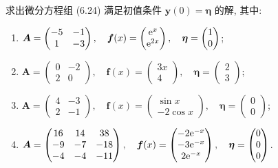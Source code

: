\begin{exercise}
  求出微分方程组 (6.24) 满足初值条件 $\bm{y}(0)=\bm{\eta}$ 的解, 其中:
  \begin{enumerate}[(1)]
  \item $\bm{A}=\begin{pmatrix}-5&-1\\1&-3\end{pmatrix},
    \quad\bm{f}(x)=\begin{pmatrix}\mathrm{e}^x\\\mathrm{e}^{2x}\end{pmatrix},
    \quad\bm{\eta}=\begin{pmatrix}1\\0\end{pmatrix}$;
  \item $\bm{A}=\begin{pmatrix}0&-2\\2&0\end{pmatrix},
    \quad\bm{f}(x)=\begin{pmatrix}3x\\4\end{pmatrix},
    \quad\bm{\eta}=\begin{pmatrix}2\\3\end{pmatrix}$;
  \item $\bm{A}=\begin{pmatrix}4&-3\\2&-1\end{pmatrix},
    \quad\bm{f}(x)=\begin{pmatrix}\sin x\\-2\cos x\end{pmatrix},
    \quad\bm{\eta}=\begin{pmatrix}0\\0\end{pmatrix}$;
  \item $\bm{A}=\begin{pmatrix}16&14&38\\-9&-7&-18\\-4&-4&-11\end{pmatrix},
    \quad\bm{f}(x)=\begin{pmatrix}-2\mathrm{e}^{-x}\\-3\mathrm{e}^{-x}\\2\mathrm{e}^{-x}\end{pmatrix},
    \quad\bm{\eta}=\begin{pmatrix}0\\0\\0\end{pmatrix}$.
  \end{enumerate}
\end{exercise}

